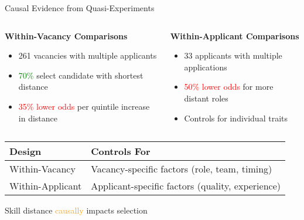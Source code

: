 \documentclass{beamer}
\begin{document}
\begin{frame}{Causal Evidence from Quasi-Experiments}
\begin{columns}
\begin{column}{0.48\textwidth}
\begin{tcolorbox}[colback=boxbackground,colframe=boxframe,sharp corners]
\textbf{Within-Vacancy Comparisons}
\begin{itemize}
    \item 261 vacancies with multiple applicants
    \item \textcolor{green}{70\%} select candidate with shortest distance
    \item \textcolor{red}{35\% lower odds} per quintile increase in distance
\end{itemize}
\end{tcolorbox}
\end{column}
\begin{column}{0.48\textwidth}
\begin{tcolorbox}[colback=boxbackground,colframe=boxframe,sharp corners]
\textbf{Within-Applicant Comparisons}
\begin{itemize}
    \item 33 applicants with multiple applications
    \item \textcolor{red}{50\% lower odds} for more distant roles
    \item Controls for individual traits
\end{itemize}
\end{tcolorbox}
\end{column}
\end{columns}

\vspace{0.3cm}
\begin{table}
\centering
\begin{tabular}{l l}
\toprule
\textbf{Design} & \textbf{Controls For} \\
\midrule
Within-Vacancy & Vacancy-specific factors (role, team, timing) \\
Within-Applicant & Applicant-specific factors (quality, experience) \\
\bottomrule
\end{tabular}
\end{table}

\vspace{0.2cm}
\begin{center}
\large Skill distance \textcolor{orange}{causally} impacts selection
\end{center}
\end{frame}
\end{document}
